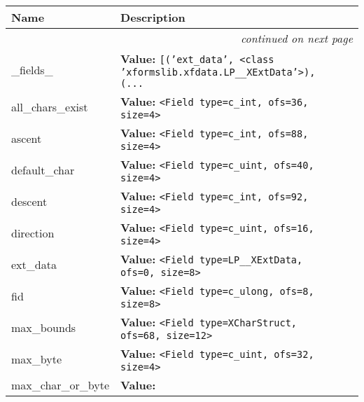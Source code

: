     \vspace{-1cm}
\hspace{\varindent}\begin{longtable}{|p{\varnamewidth}|p{\vardescrwidth}|l}
\cline{1-2}
\cline{1-2} \centering \textbf{Name} & \centering \textbf{Description}& \\
\cline{1-2}
\endhead\cline{1-2}\multicolumn{3}{r}{\small\textit{continued on next page}}\\\endfoot\cline{1-2}
\endlastfoot\raggedright \_\-f\-i\-e\-l\-d\-s\-\_\- & \raggedright \textbf{Value:} 
{\tt \texttt{[}\texttt{(}\texttt{'}\texttt{ext\_data}\texttt{'}\texttt{, }{\textless}class 'xformslib.xfdata.LP\_\_XExtData'{\textgreater}\texttt{)}\texttt{, }\texttt{(}\texttt{...}}&\\
\cline{1-2}
\raggedright a\-l\-l\-\_\-c\-h\-a\-r\-s\-\_\-e\-x\-i\-s\-t\- & \raggedright \textbf{Value:} 
{\tt {\textless}Field type=c\_int, ofs=36, size=4{\textgreater}}&\\
\cline{1-2}
\raggedright a\-s\-c\-e\-n\-t\- & \raggedright \textbf{Value:} 
{\tt {\textless}Field type=c\_int, ofs=88, size=4{\textgreater}}&\\
\cline{1-2}
\raggedright d\-e\-f\-a\-u\-l\-t\-\_\-c\-h\-a\-r\- & \raggedright \textbf{Value:} 
{\tt {\textless}Field type=c\_uint, ofs=40, size=4{\textgreater}}&\\
\cline{1-2}
\raggedright d\-e\-s\-c\-e\-n\-t\- & \raggedright \textbf{Value:} 
{\tt {\textless}Field type=c\_int, ofs=92, size=4{\textgreater}}&\\
\cline{1-2}
\raggedright d\-i\-r\-e\-c\-t\-i\-o\-n\- & \raggedright \textbf{Value:} 
{\tt {\textless}Field type=c\_uint, ofs=16, size=4{\textgreater}}&\\
\cline{1-2}
\raggedright e\-x\-t\-\_\-d\-a\-t\-a\- & \raggedright \textbf{Value:} 
{\tt {\textless}Field type=LP\_\_XExtData, ofs=0, size=8{\textgreater}}&\\
\cline{1-2}
\raggedright f\-i\-d\- & \raggedright \textbf{Value:} 
{\tt {\textless}Field type=c\_ulong, ofs=8, size=8{\textgreater}}&\\
\cline{1-2}
\raggedright m\-a\-x\-\_\-b\-o\-u\-n\-d\-s\- & \raggedright \textbf{Value:} 
{\tt {\textless}Field type=XCharStruct, ofs=68, size=12{\textgreater}}&\\
\cline{1-2}
\raggedright m\-a\-x\-\_\-b\-y\-t\-e\-1\- & \raggedright \textbf{Value:} 
{\tt {\textless}Field type=c\_uint, ofs=32, size=4{\textgreater}}&\\
\cline{1-2}
\raggedright m\-a\-x\-\_\-c\-h\-a\-r\-\_\-o\-r\-\_\-b\-y\-t\-e\-2\- & \raggedright \textbf{Value:} 

\end{longtable}
